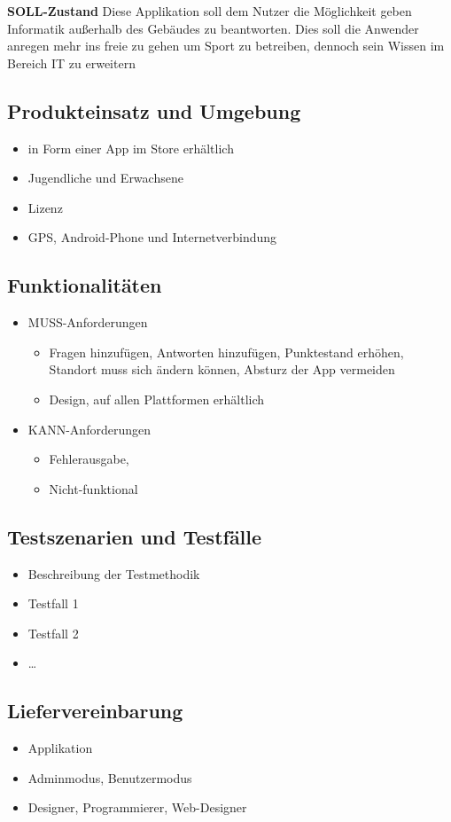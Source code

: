 \textbf {SOLL-Zustand}
Diese Applikation soll dem Nutzer die Möglichkeit geben Informatik außerhalb des Gebäudes zu beantworten. Dies soll die Anwender anregen mehr ins freie zu gehen um Sport zu betreiben, dennoch sein Wissen im Bereich IT zu erweitern


\subsection{Produkteinsatz und Umgebung}
\begin{itemize}
	\item in Form einer App im Store erhältlich
	\item Jugendliche und Erwachsene
	\item Lizenz
	\item GPS, Android-Phone und Internetverbindung
\end{itemize}
\subsection{Funktionalitäten}
\begin{itemize}
	\item MUSS-Anforderungen
	\begin{itemize}
		\item Fragen hinzufügen, Antworten hinzufügen, Punktestand erhöhen, Standort muss sich ändern können, Absturz der App vermeiden
		\item Design, auf allen Plattformen erhältlich
	\end{itemize}
	\item KANN-Anforderungen
	\begin{itemize}
		\item Fehlerausgabe, 
		\item Nicht-funktional
	\end{itemize}
\end{itemize}
\subsection{Testszenarien und Testfälle}
\begin{itemize}
	\item Beschreibung der Testmethodik
	\item Testfall 1
	\item Testfall 2
	\item \ldots
\end{itemize}
\subsection{Liefervereinbarung}
\begin{itemize}
	\item Applikation
	\item Adminmodus, Benutzermodus
	\item Designer, Programmierer, Web-Designer
\end{itemize}
